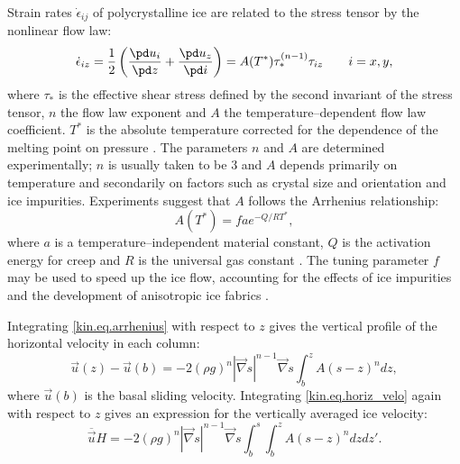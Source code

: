 Strain rates $\dot{\epsilon}_{ij}$ of polycrystalline ice are related to the stress tensor by the nonlinear flow law:
\begin{equation}
  \label{kin.eq.flowlaw}
  \dot{\epsilon}_{iz}=\frac12\left(\frac{\pd u_i}{\pd z}+\frac{\pd u_z}{\pd i}\right)=A(T^\ast)\tau_\ast^{(n-1)}\tau_{iz}\qquad i=x,y,
\end{equation}
where $\tau_\ast$ is the effective shear stress defined by the second invariant of the stress tensor, $n$ the flow law exponent and $A$ the temperature--dependent flow law coefficient. $T^\ast$ is the absolute temperature corrected for the dependence of the melting point on pressure 
\cite[$T^\ast=T+8.7\cdot10^{-4}(s-z)$, $T$ in Kelvin,][]{Huybrechts1986}. 
The parameters $n$ and $A$ are determined experimentally; $n$ is usually taken to be 3 and $A$ depends primarily on temperature and secondarily on factors such as crystal
size and orientation and ice impurities. 
Experiments suggest that $A$ follows the Arrhenius relationship:
\begin{equation}
  \label{kin.eq.arrhenius}
  A(T^\ast)=fae^{-Q/RT^\ast},
\end{equation}where $a$ is a temperature--independent material constant, $Q$ is the activation energy for creep and $R$ is the universal gas constant \citep{Paterson1994}. 
The tuning parameter $f$ may be used to speed up the ice flow, accounting for the effects of ice impurities and the development of anisotropic ice fabrics \citep{Payne1999,Tarasov1999,Tarasov2000,Peltier2000}.

Integrating \eqref{kin.eq.arrhenius} with respect to $z$ gives the vertical profile of the horizontal velocity in each column:
\begin{equation}
  \label{kin.eq.horiz_velo}
  \vec u(z)-\vec u(b) = -2(\rho g)^n|\vec\nabla s|^{n-1}\vec\nabla s\int_b^zA(s-z)^ndz,
\end{equation}
where $\vec u(b)$ is the basal sliding velocity. Integrating \eqref{kin.eq.horiz_velo} again with respect to $z$ gives an expression for the vertically averaged ice velocity:
\begin{equation}
  \label{kin.eq.avg_velo}
  \overline{\vec u}H=-2(\rho g)^n|\vec\nabla s|^{n-1}\vec\nabla s\int_b^s\int_b^zA(s-z)^ndzdz'.
\end{equation}

